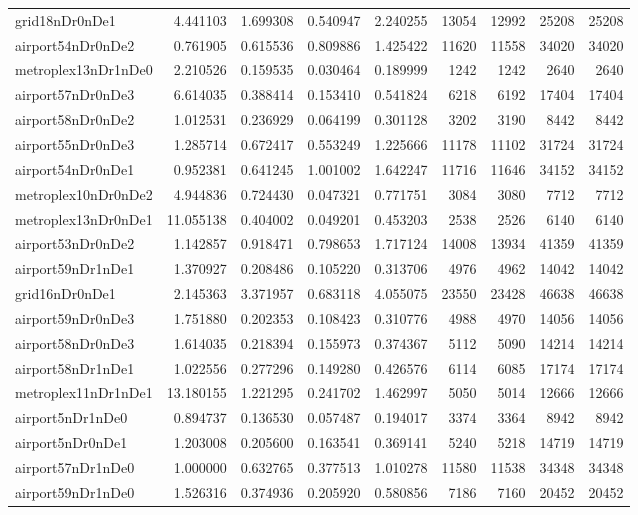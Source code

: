 \begin{longtable}{|l|r|r|r|r|r|r|r|r|}
grid18nDr0nDe1 & 4.441103 & 1.699308 & 0.540947 & 2.240255 & 13054 & 12992 & 25208 & 25208 \\
airport54nDr0nDe2 & 0.761905 & 0.615536 & 0.809886 & 1.425422 & 11620 & 11558 & 34020 & 34020 \\
metroplex13nDr1nDe0 & 2.210526 & 0.159535 & 0.030464 & 0.189999 & 1242 & 1242 & 2640 & 2640 \\
airport57nDr0nDe3 & 6.614035 & 0.388414 & 0.153410 & 0.541824 & 6218 & 6192 & 17404 & 17404 \\
airport58nDr0nDe2 & 1.012531 & 0.236929 & 0.064199 & 0.301128 & 3202 & 3190 & 8442 & 8442 \\
airport55nDr0nDe3 & 1.285714 & 0.672417 & 0.553249 & 1.225666 & 11178 & 11102 & 31724 & 31724 \\
airport54nDr0nDe1 & 0.952381 & 0.641245 & 1.001002 & 1.642247 & 11716 & 11646 & 34152 & 34152 \\
metroplex10nDr0nDe2 & 4.944836 & 0.724430 & 0.047321 & 0.771751 & 3084 & 3080 & 7712 & 7712 \\
metroplex13nDr0nDe1 & 11.055138 & 0.404002 & 0.049201 & 0.453203 & 2538 & 2526 & 6140 & 6140 \\
airport53nDr0nDe2 & 1.142857 & 0.918471 & 0.798653 & 1.717124 & 14008 & 13934 & 41359 & 41359 \\
airport59nDr1nDe1 & 1.370927 & 0.208486 & 0.105220 & 0.313706 & 4976 & 4962 & 14042 & 14042 \\
grid16nDr0nDe1 & 2.145363 & 3.371957 & 0.683118 & 4.055075 & 23550 & 23428 & 46638 & 46638 \\
airport59nDr0nDe3 & 1.751880 & 0.202353 & 0.108423 & 0.310776 & 4988 & 4970 & 14056 & 14056 \\
airport58nDr0nDe3 & 1.614035 & 0.218394 & 0.155973 & 0.374367 & 5112 & 5090 & 14214 & 14214 \\
airport58nDr1nDe1 & 1.022556 & 0.277296 & 0.149280 & 0.426576 & 6114 & 6085 & 17174 & 17174 \\
metroplex11nDr1nDe1 & 13.180155 & 1.221295 & 0.241702 & 1.462997 & 5050 & 5014 & 12666 & 12666 \\
airport5nDr1nDe0 & 0.894737 & 0.136530 & 0.057487 & 0.194017 & 3374 & 3364 & 8942 & 8942 \\
airport5nDr0nDe1 & 1.203008 & 0.205600 & 0.163541 & 0.369141 & 5240 & 5218 & 14719 & 14719 \\
airport57nDr1nDe0 & 1.000000 & 0.632765 & 0.377513 & 1.010278 & 11580 & 11538 & 34348 & 34348 \\
airport59nDr1nDe0 & 1.526316 & 0.374936 & 0.205920 & 0.580856 & 7186 & 7160 & 20452 & 20452 \\

\end{longtable}
